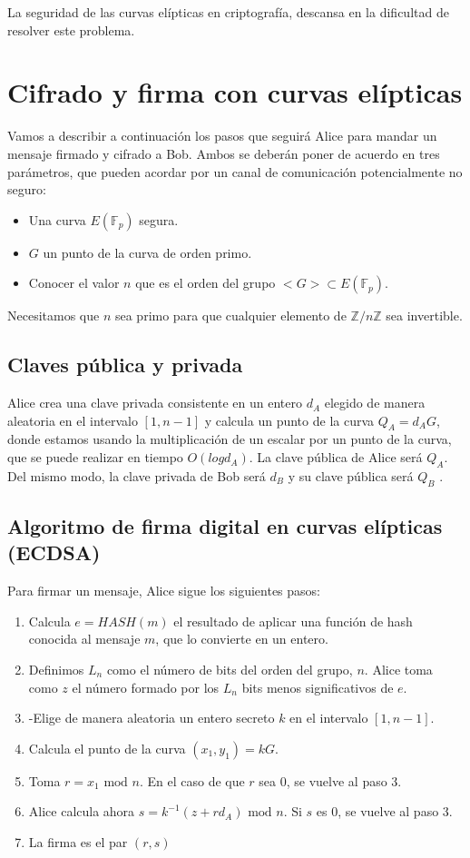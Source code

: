 \documentclass{article}
\begin{document}
La seguridad de las curvas elípticas en criptografía, descansa en la
dificultad de resolver este problema.

\section{Cifrado y firma con curvas elípticas}

Vamos a describir a continuación los pasos que seguirá Alice para
mandar un mensaje firmado y cifrado a Bob. Ambos se deberán poner de
acuerdo en tres parámetros, que pueden acordar por un canal de
comunicación potencialmente no seguro:

\begin{itemize}
\item Una curva $E(\mathbb{F}_p)$ segura.
\item $G$ un punto de la curva de orden primo.
\item Conocer el valor $n$ que es el orden del grupo $<G>\subset
E(\mathbb{F}_p)$.
\end{itemize}

Necesitamos que $n$ sea primo para que cualquier elemento de
$\mathbb{Z}/n\mathbb{Z}$ sea invertible.

\subsection{Claves pública y privada} Alice crea una clave privada
consistente en un entero $d_A$ elegido de manera aleatoria en el
intervalo $[1,n-1]$ y calcula un punto de la curva $Q_A=d_AG$, donde
estamos usando la multiplicación de un escalar por un punto de la
curva, que se puede realizar en tiempo $O(log d_A)$. La clave pública
de Alice será $Q_A$. Del mismo modo, la clave privada de Bob será
$d_B$ y su clave pública será $Q_B$ .

\subsection{Algoritmo de firma digital en curvas elípticas (ECDSA)}

Para firmar un mensaje, Alice sigue los siguientes pasos:

\begin{enumerate}
\item Calcula $e=HASH(m)$ el resultado de aplicar una función de
hash conocida al mensaje $m$, que lo convierte en un entero.
\item Definimos $L_n$ como el número de bits del orden del grupo,
$n$. Alice toma como $z$ el número formado por los $L_n$ bits menos
significativos de $e$.
\item-Elige de manera aleatoria un entero secreto $k$ en el
intervalo $[1,n-1]$.
\item Calcula el punto de la curva $(x_1, y_1)=kG$.
\item Toma $r = x_1 \text{ mod }n$. En el caso de que $r$ sea 0,
se vuelve al paso 3.
\item Alice calcula ahora $s=k^{-1}(z+rd_A) \text{ mod }n$. Si $s$ es 0,
se vuelve al paso 3.
\item La firma es el par $(r,s)$
\end{enumerate}
\end{document}
